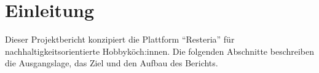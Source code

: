 \section{Einleitung}\label{sec:einleitung}

Dieser Projektbericht konzipiert die Plattform \enquote{Resteria} für nachhaltigkeitsorientierte Hobbyköch:innen. Die folgenden Abschnitte beschreiben die Ausgangslage, das Ziel und den Aufbau des Berichts.




